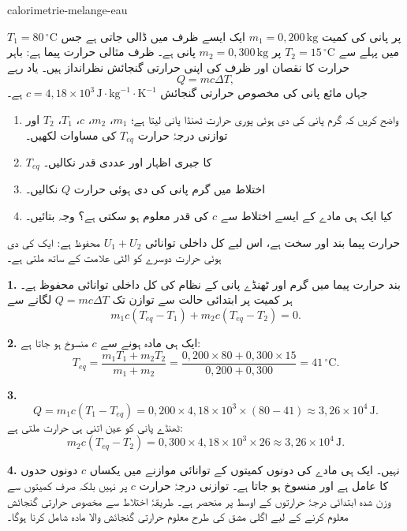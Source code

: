 \begin{exo}{calorimetrie-melange-eau}

$T_1=80\,{}^\circ\text{C}$ پر پانی کی کمیت $m_1=0{,}200\,\text{kg}$ ایک ایسے ظرف میں ڈالی جاتی ہے جس میں پہلے سے $T_2=15\,{}^\circ\text{C}$ پر $m_2=0{,}300\,\text{kg}$ پانی ہے۔ ظرف مثالی حرارت پیما ہے: باہر حرارت کا نقصان اور ظرف کی اپنی حرارتی گنجائش نظرانداز ہیں۔ یاد رہے
\[
Q=mc\Delta T,
\]
جہاں مائع پانی کی مخصوص حرارتی گنجائش $c=4{,}18\times10^3\,\text{J}\!\cdot\!\text{kg}^{-1}\!\cdot\!\text{K}^{-1}$ ہے۔

\begin{enumerate}
  \item واضح کریں کہ گرم پانی کی دی ہوئی پوری حرارت ٹھنڈا پانی لیتا ہے؛ $m_1$، $m_2$، $c$، $T_1$، $T_2$ اور توازنی درجۂ حرارت $T_{eq}$ کی مساوات لکھیں۔
  \item $T_{eq}$ کا جبری اظہار اور عددی قدر نکالیں۔
  \item اختلاط میں گرم پانی کی دی ہوئی حرارت $Q$ نکالیں۔
  \item کیا ایک ہی مادے کے ایسے اختلاط سے $c$ کی قدر معلوم ہو سکتی ہے؟ وجہ بتائیں۔
\end{enumerate}

\begin{indication}
حرارت پیما بند اور سخت ہے، اس لیے کل داخلی توانائی $U_1+U_2$ محفوظ ہے: ایک کی دی ہوئی حرارت دوسرے کو الٹی علامت کے ساتھ ملتی ہے۔
\end{indication}

\begin{solution}
\textbf{1.} بند حرارت پیما میں گرم اور ٹھنڈے پانی کے نظام کی کل داخلی توانائی محفوظ ہے۔ ہر کمیت پر ابتدائی حالت سے توازن تک $Q=mc\Delta T$ لگانے سے
\[
m_1c(T_{eq}-T_1)+m_2c(T_{eq}-T_2)=0.
\]

\textbf{2.} ایک ہی مادہ ہونے سے $c$ منسوخ ہو جاتا ہے:
\[
T_{eq}=\frac{m_1T_1+m_2T_2}{m_1+m_2}
=\frac{0{,}200\times80+0{,}300\times15}{0{,}200+0{,}300}
=41\,{}^\circ\text{C}.
\]

\textbf{3.}
\[
Q=m_1c(T_1-T_{eq})
=0{,}200\times4{,}18\times10^3\times(80-41)
\approx3{,}26\times10^4\,\text{J}.
\]
ٹھنڈے پانی کو عین اتنی ہی حرارت ملتی ہے:
\[
m_2c(T_{eq}-T_2)=0{,}300\times4{,}18\times10^3\times26\approx3{,}26\times10^4\,\text{J}.
\]

\textbf{4.} نہیں۔ ایک ہی مادے کی دونوں کمیتوں کے توانائی موازنے میں یکساں $c$ دونوں حدوں کا عامل ہے اور منسوخ ہو جاتا ہے۔ توازنی درجۂ حرارت $c$ پر نہیں بلکہ صرف کمیتوں سے وزن شدہ ابتدائی درجۂ حرارتوں کے اوسط پر منحصر ہے۔ طریقۂ اختلاط سے مخصوص حرارتی گنجائش معلوم کرنے کے لیے اگلی مشق کی طرح معلوم حرارتی گنجائش والا مادہ شامل کرنا ہوگا۔
\end{solution}
\end{exo}

